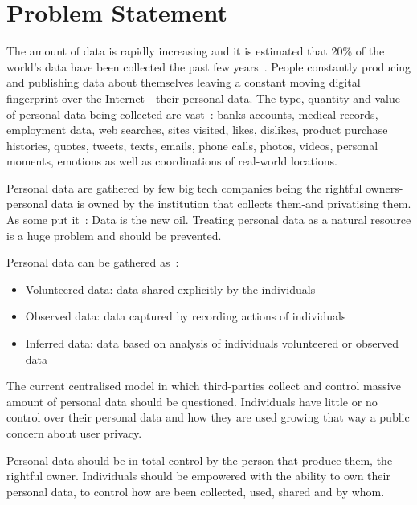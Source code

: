 \chapter{Problem Statement}
\label{problem}

The amount of data is rapidly increasing and it is estimated that 20\% of the world's data have been collected the past
few years~\cite{10.1109/SPW.2015.27,big_data_better_worse}. People constantly producing and publishing data about themselves
leaving a constant moving digital fingerprint over the Internet---their personal data. The type, quantity and value of personal data
being collected are vast~\cite{emergence_new_assets_wef}: banks accounts, medical records, employment data, web searches, sites visited,
likes, dislikes, product purchase histories, quotes, tweets, texts, emails, phone calls, photos, videos, personal moments, emotions
as well as coordinations of real-world locations.

Personal data are gathered by few big tech companies being the rightful owners-personal data is owned by the institution that collects them-and privatising them.
As some put it~\cite{data_new_oil_01,data_new_oil_02,data_new_oil_03,data_new_oil_04,data_new_oil_05,data_new_oil_05,data_new_oil_06,data_new_oil_07,data_new_oil_08,data_new_oil_09}: Data is the new oil. Treating personal data as a natural resource is a huge problem and should be prevented. 

Personal data can be gathered as~\cite{emergence_new_assets_wef}:
\begin{itemize}
  \item Volunteered data: data shared explicitly by the individuals
  \item Observed data: data captured by recording actions of individuals
  \item Inferred data: data based on analysis of individuals volunteered or observed data
\end{itemize}

The current centralised model in which third-parties collect and control massive amount of personal data should be questioned.
Individuals have little or no control over their personal data and how they are used growing that way a public concern about
user privacy.

Personal data should be in total control by the person that produce them, the rightful owner. Individuals should be empowered
with the ability to own their personal data, to control how are been collected, used, shared and by whom.


